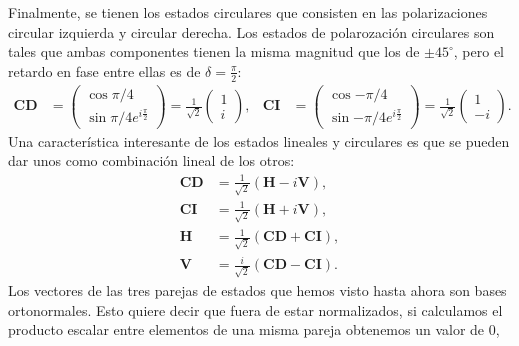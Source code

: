Finalmente, se tienen los estados circulares que consisten en las
polarizaciones circular izquierda y circular derecha. Los estados de
polarozación circulares son tales que
ambas componentes tienen la misma magnitud que los de $\pm45^{\circ}$,
pero el retardo en fase entre ellas es de $\delta = \frac{\pi}{2}$:
\begin{align*}
\mathbf{CD}
&=\begin{pmatrix}\cos{\pi/4}\\\sin{\pi/4}e^{i\frac{\pi}{2}}\end{pmatrix}=\frac{1}{\sqrt{2}}
\begin{pmatrix}1\\i\end{pmatrix},&
\mathbf{CI} 
&=\begin{pmatrix}\cos{-\pi/4}\\\sin{-\pi/4}e^{i\frac{\pi}{2}}\end{pmatrix}=\frac{1}{\sqrt{2}}\begin{pmatrix}1\\-i\end{pmatrix}. 
\end{align*} 
Una característica interesante de los estados lineales y circulares es
que se pueden dar unos como combinación lineal de los otros:
\begin{align*}
\mathbf{CD} &= \frac{1}{\sqrt{2}}\left( \mathbf{H} -
  i\mathbf{V}\right),\\
\mathbf{CI} &= \frac{1}{\sqrt{2}}\left( \mathbf{H} +
  i\mathbf{V}\right),\\
\mathbf{H} &= \frac{1}{\sqrt{2}}\left( \mathbf{CD} +
  \mathbf{CI}\right),\\
\mathbf{V} &= \frac{i}{\sqrt{2}}\left( \mathbf{CD} -
  \mathbf{CI}\right).
\end{align*}
Los vectores de las tres parejas de estados que hemos visto hasta
ahora son bases ortonormales. Esto quiere decir que fuera de estar
normalizados, %
si calculamos el producto escalar entre elementos de una misma pareja
obtenemos un valor de 0,
